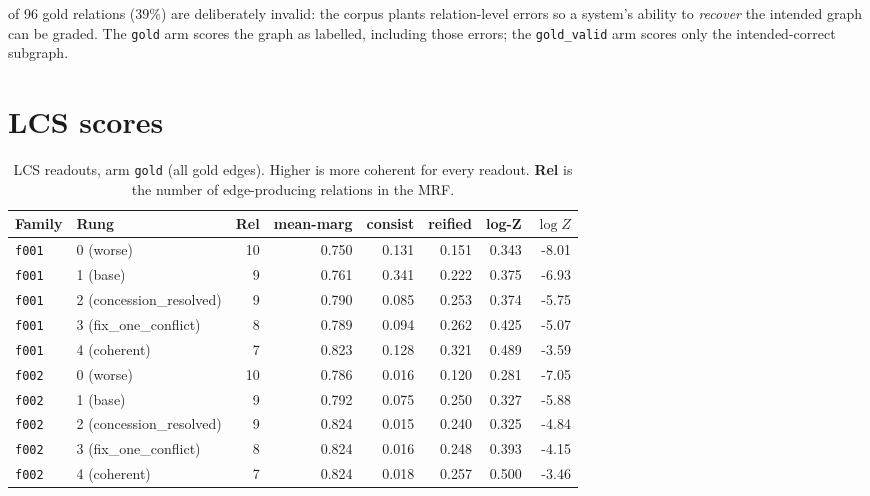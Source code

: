 \documentclass[11pt]{article}
\begin{document}
 of 96 gold relations (39\%) are deliberately invalid: the corpus plants relation-level errors so a system's ability to \emph{recover} the intended graph can be graded. The \texttt{gold} arm scores the graph as labelled, including those errors; the \texttt{gold\_valid} arm scores only the intended-correct subgraph.

\section{LCS scores}

\begin{table}[htbp]
\centering
\small
\caption{LCS readouts, arm \texttt{gold} (all gold edges). Higher is more coherent for every readout. \textbf{Rel} is the number of edge-producing relations in the MRF.}
\label{tab:scores-gold}
\begin{tabular}{llrrrrrr}
\toprule
Family & Rung & Rel & \textbf{mean-marg} & \textbf{consist} & \textbf{reified} & \textbf{log-Z} & $\log Z$ \\
\midrule
\texttt{f001} & 0 (worse) & 10 & 0.750 & 0.131 & 0.151 & 0.343 & -8.01 \\
\texttt{f001} & 1 (base) & 9 & 0.761 & 0.341 & 0.222 & 0.375 & -6.93 \\
\texttt{f001} & 2 (concession\_resolved) & 9 & 0.790 & 0.085 & 0.253 & 0.374 & -5.75 \\
\texttt{f001} & 3 (fix\_one\_conflict) & 8 & 0.789 & 0.094 & 0.262 & 0.425 & -5.07 \\
\texttt{f001} & 4 (coherent) & 7 & 0.823 & 0.128 & 0.321 & 0.489 & -3.59 \\
\midrule
\texttt{f002} & 0 (worse) & 10 & 0.786 & 0.016 & 0.120 & 0.281 & -7.05 \\
\texttt{f002} & 1 (base) & 9 & 0.792 & 0.075 & 0.250 & 0.327 & -5.88 \\
\texttt{f002} & 2 (concession\_resolved) & 9 & 0.824 & 0.015 & 0.240 & 0.325 & -4.84 \\
\texttt{f002} & 3 (fix\_one\_conflict) & 8 & 0.824 & 0.016 & 0.248 & 0.393 & -4.15 \\
\texttt{f002} & 4 (coherent) & 7 & 0.824 & 0.018 & 0.257 & 0.500 & -3.46 \\
\bottomrule
\end{tabular}
\end{table}
\end{document}
